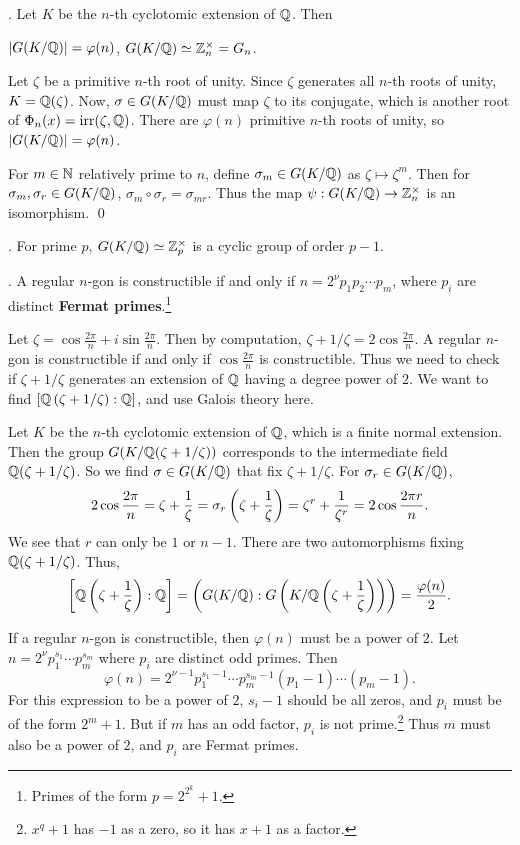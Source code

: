 \thm. Let \(K\) be the \(n\)-th cyclotomic extension of \(\mathbb{Q}\). Then
\begin{center}
    \(\left| G(K/\mathbb{Q}) \right| = \varphi(n)\), \quad \(G(K/\mathbb{Q}) \simeq \mathbb{Z}_n^\times = G_n\).
\end{center}

\pf Let \(\zeta\) be a primitive \(n\)-th root of unity. Since \(\zeta\) generates all \(n\)-th roots of unity, \(K = \mathbb{Q}(\zeta)\). Now, \(\sigma \in G(K/\mathbb{Q})\) must map \(\zeta\) to its conjugate, which is another root of \(\Phi_n(x) = \mathrm{irr}(\zeta, \mathbb{Q})\). There are \(\varphi(n)\) primitive \(n\)-th roots of unity, so \(\left| G(K/\mathbb{Q}) \right| = \varphi(n)\).

For \(m \in \mathbb{N}\) relatively prime to \(n\), define \(\sigma_m \in G(K/\mathbb{Q})\) as \(\zeta \mapsto \zeta^m\). Then for \(\sigma_m, \sigma_r \in G(K/\mathbb{Q})\), \(\sigma_m \circ \sigma_r = \sigma_{mr}\). Thus the map \(\psi : G(K/\mathbb{Q}) \rightarrow \mathbb{Z}_n^\times\) is an isomorphism. \qed

\cor. For prime \(p\), \(G(K/\mathbb{Q}) \simeq \mathbb{Z}_p^\times\) is a cyclic group of order \(p - 1\).

\thm. A regular \(n\)-gon is constructible if and only if \(n = 2^\nu p_1 p_2 \cdots p_m\), where \(p_i\) are distinct \textbf{Fermat primes}.\footnote{Primes of the form \(p = 2^{2^k} + 1\).}

\pf Let \(\zeta = \cos \frac{2\pi}{n} + i \sin \frac{2\pi}{n}\). Then by computation, \(\zeta + 1/\zeta = 2\cos \frac{2\pi}{n}\). A regular \(n\)-gon is constructible if and only if \(\cos \frac{2\pi}{n}\) is constructible. Thus we need to check if \(\zeta + 1/\zeta\) generates an extension of \(\mathbb{Q}\) having a degree power of \(2\). We want to find \([\mathbb{Q}\left( \zeta + 1/\zeta \right) : \mathbb{Q}]\), and use Galois theory here.

Let \(K\) be the \(n\)-th cyclotomic extension of \(\mathbb{Q}\), which is a finite normal extension. Then the group \(G(K/\mathbb{Q}(\zeta + 1/\zeta))\) corresponds to the intermediate field \(\mathbb{Q}(\zeta + 1/\zeta)\). So we find \(\sigma \in G(K/\mathbb{Q})\) that fix \(\zeta + 1/\zeta\). For \(\sigma_r \in G(K/\mathbb{Q})\),
\[
    2\cos \frac{2\pi}{n} = \zeta + \frac{1}{\zeta} = \sigma_r\left( \zeta + \frac{1}{\zeta} \right) = \zeta^r + \frac{1}{\zeta^r} = 2\cos \frac{2\pi r}{n}.
\]
We see that \(r\) can only be \(1\) or \(n-1\). There are two automorphisms fixing \(\mathbb{Q}(\zeta + 1/\zeta)\). Thus,
\[
    \left[\mathbb{Q}\left( \zeta + \frac{1}{\zeta} \right) : \mathbb{Q}\right] = \left( G(K/\mathbb{Q}) : G\left( K/\mathbb{Q}\left( \zeta + \frac{1}{\zeta} \right) \right) \right) = \frac{\varphi(n)}{2}.
\]

\note{\mimp} If a regular \(n\)-gon is constructible, then \(\varphi(n)\) must be a power of \(2\). Let \(n = 2^\nu p_1^{s_1}\cdots p_m^{s_m}\) where \(p_i\) are distinct odd primes. Then
\[
    \varphi(n) = 2^{\nu-1}p_1^{s_1-1}\cdots p_m^{s_m-1}(p_1-1)\cdots (p_m-1).
\]
For this expression to be a power of \(2\), \(s_i - 1\) should be all zeros, and \(p_i\) must be of the form \(2^m + 1\). But if \(m\) has an odd factor, \(p_i\) is not prime.\footnote{\(x^q + 1\) has \(-1\) as a zero, so it has \(x+1\) as a factor.} Thus \(m\) must also be a power of \(2\), and \(p_i\) are Fermat primes.

